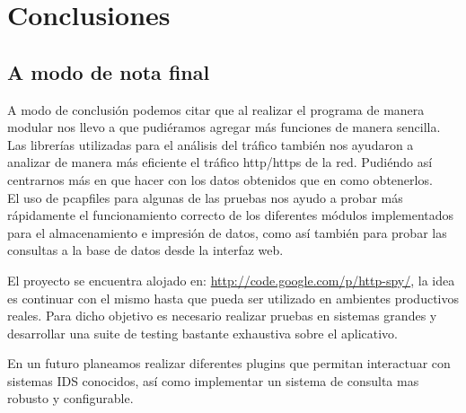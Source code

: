 \section{Conclusiones}

\subsection{A modo de nota final}

A modo de conclusión podemos citar que al realizar el programa de manera 
modular nos llevo a que pudiéramos agregar más funciones de manera sencilla. 
\\Las librerías utilizadas para el análisis del tráfico también nos ayudaron 
a analizar de manera más eficiente el tráfico http/https de la red. Pudiéndo 
así centrarnos más en que hacer con los datos obtenidos que en como obtenerlos.
\\El uso de pcapfiles para algunas de las pruebas nos ayudo a probar más rápidamente 
el funcionamiento correcto de los diferentes módulos implementados para el almacenamiento
e impresión de datos, como así también para probar las consultas a la base de datos 
desde la interfaz web.

El proyecto se encuentra alojado en: \url{http://code.google.com/p/http-spy/}, la idea es continuar con el mismo hasta que pueda ser utilizado en ambientes productivos reales. Para dicho objetivo es necesario realizar pruebas en sistemas grandes y desarrollar una suite de testing bastante exhaustiva sobre el aplicativo.

En un futuro planeamos realizar diferentes plugins que permitan interactuar con sistemas IDS conocidos, así como implementar un sistema de consulta mas robusto y configurable.